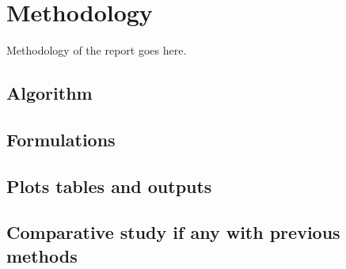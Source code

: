 \section{Methodology}

Methodology of the report goes here.

\subsection{Algorithm}

\subsection{Formulations}

\subsection{Plots tables and outputs}

\subsection{Comparative study if any with previous methods}
